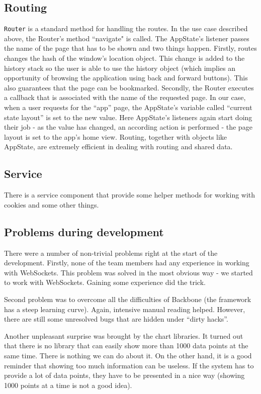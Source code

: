 \documentclass{l3proj}
\begin{document}
\subsection{Routing}

\texttt{Router} is a standard method for handling the routes. In the use case described above, the Router's method ``navigate" is called. The AppState's listener passes the name of the page that has to be shown and two things happen. Firstly, routes changes the hash of the window's location object. This change is added to the history stack so the user is able to use the history object (which implies an opportunity of browsing the application using back and forward buttons). This also guarantees that the page can be bookmarked. Secondly, the Router executes a callback that is associated with the name of the requested page. In our case, when a user requests for the ``app'' page, the AppState's variable called ``current state layout'' is set to the new value. Here AppState's listeners again start doing their job - as the value has changed, an according action is performed - the page layout is set to the app's home view. Routing, together with objects like AppState, are extremely efficient in dealing with routing and shared data.

\subsection{Service}

There is a service component that provide some helper methods for working with cookies and some other things.


\subsection{Problems during development}

There were a number of non-trivial problems right at the start of the development. Firstly, none of the team members had any experience in working with WebSockets. This problem was solved in the most obvious way - we started to work with WebSockets. Gaining some experience did the trick.

Second problem was to overcome all the difficulties of Backbone (the framework has a steep learning curve). Again, intensive manual reading helped. However, there are still some unresolved bugs that are hidden under ``dirty hacks''. 

Another unpleasant surprise was brought by the chart libraries. It turned out that there is no library that can easily show more than 1000 data points at the same time. There is nothing we can do about it. On the other hand, it is a good reminder that showing too much information can be useless. If the system has to provide a lot of data points, they have to be presented in a nice way (showing 1000 points at a time is not a good idea).
\end{document}
